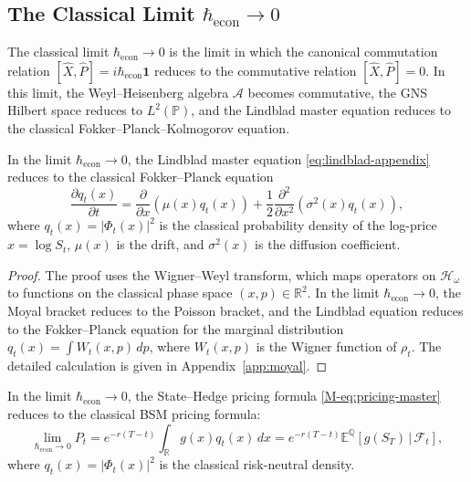 \subsection{The Classical Limit \texorpdfstring{$\hbar_{\mathrm{econ}} \to 0$}{hbar\_econ to 0}}

The classical limit $\hbar_{\mathrm{econ}} \to 0$ is the limit in which the
canonical commutation relation $[\hat{X}, \hat{P}] = i\hbar_{\mathrm{econ}}
\mathbf{1}$ reduces to the commutative relation $[\hat{X}, \hat{P}] = 0$. In
this limit, the Weyl--Heisenberg algebra $\mathcal{A}$ becomes commutative, the
GNS Hilbert space reduces to $L^2(\mathbb{P})$, and the Lindblad master equation
reduces to the classical Fokker--Planck--Kolmogorov equation.

\begin{theorem}\label{thm:classical-limit-lindblad}
In the limit $\hbar_{\mathrm{econ}} \to 0$, the Lindblad master equation
\eqref{eq:lindblad-appendix} reduces to the classical Fokker--Planck equation
\begin{equation*}
    \frac{\partial q_t(x)}{\partial t} = \frac{\partial}{\partial x}
        \left(\mu(x) q_t(x)\right)
        + \frac{1}{2} \frac{\partial^2}{\partial x^2}
        \left(\sigma^2(x) q_t(x)\right),
\end{equation*}
where $q_t(x) = |\Phi_t(x)|^2$ is the classical probability density of the
log-price $x = \log S_t$, $\mu(x)$ is the drift, and $\sigma^2(x)$ is the
diffusion coefficient.
\end{theorem}

\begin{proof}
The proof uses the Wigner--Weyl transform, which maps operators on
$\mathcal{H}_\omega$ to functions on the classical phase space
$(x, p) \in \mathbb{R}^2$. In the limit $\hbar_{\mathrm{econ}} \to 0$, the Moyal
bracket reduces to the Poisson bracket, and the Lindblad equation reduces to the
Fokker--Planck equation for the marginal distribution
$q_t(x) = \int W_t(x, p) \, dp$, where $W_t(x, p)$ is the Wigner function of
$\rho_t$. The detailed calculation is given in Appendix~\ref{app:moyal}.
\end{proof}

\begin{corollary}\label{cor:classical-limit-pricing}
In the limit $\hbar_{\mathrm{econ}} \to 0$, the State--Hedge pricing formula
\eqref{M-eq:pricing-master} reduces to the classical BSM pricing formula:
\begin{equation*}
    \lim_{\hbar_{\mathrm{econ}} \to 0} P_t
    = e^{-r(T-t)} \int_{\mathbb{R}} g(x) q_t(x) \, dx
    = e^{-r(T-t)} \mathbb{E}^{\mathbb{Q}}[g(S_T) \,|\, \mathcal{F}_t],
\end{equation*}
where $q_t(x) = |\Phi_t(x)|^2$ is the classical risk-neutral density.
\end{corollary}

